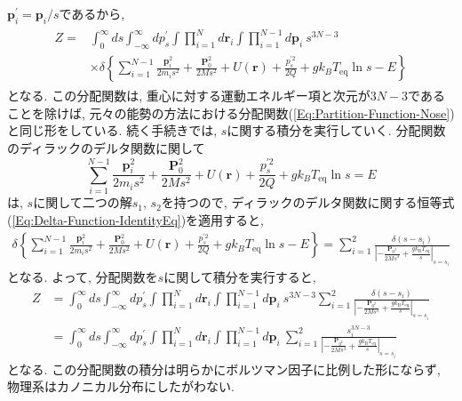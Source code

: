 $\bm{p}_{i}^{\prime} = \bm{p}_{i}/s$であるから, 
\begin{align}
  \begin{split}
  Z =&
  \int_{0}^{\infty} ds
  \int_{- \infty}^{\infty} dp^{\prime}_{s}
  \int \prod_{i=1}^{N} d \bm{r}_{i}
  \int \prod_{i=1}^{N-1} d \bm{p}_{i}~
  s^{3N-3} \\ &\times
  \delta
  \left\{
    \sum_{i=1}^{N-1} \frac{\bm{p}_{i}^{2}}{2m_{i}s^{2}} +
    \frac{\bm{P}_{0}^2}{2Ms^{2}} +
    U(\bm{r}) +
    \frac{p^{\prime 2}_{s}}{2Q} + g k_B T_{\mathrm{eq}} \ln s - E
  \right\}
  \end{split}
\end{align}
となる. この分配関数は, 重心に対する運動エネルギー項と次元が$3N-3$であることを除けば, 元々の能勢の方法における分配関数(\ref{Eq:Partition-Function-Nose})と同じ形をしている. 
続く手続きでは, $s$に関する積分を実行していく. 
分配関数のディラックのデルタ関数に関して
\begin{equation}
  \sum_{i=1}^{N-1} \frac{\bm{p}_{i}^{2}}{2m_{i}s^{2}} +
  \frac{\bm{P}_{0}^2}{2Ms^{2}} +
  U(\bm{r}) +
  \frac{p^{\prime 2}_{s}}{2Q} + g k_B T_{\mathrm{eq}} \ln s = E
\end{equation}
は, $s$に関して二つの解$s_{1}$, $s_{2}$を持つので, ディラックのデルタ関数に関する恒等式(\ref{Eq:Delta-Function-IdentityEq})を適用すると, 
\begin{align}
  \delta
  \left\{
    \sum_{i=1}^{N-1} \frac{\bm{p}_{i}^{2}}{2m_{i}s^{2}} +
    \frac{\bm{P}_{0}^2}{2Ms^{2}} +
    U(\bm{r}) +
    \frac{p^{\prime 2}_{s}}{2Q} + g k_B T_{\mathrm{eq}} \ln s - E
  \right\}
  =
  \sum_{i=1}^{2}
  \frac
  {\delta(s - s_{i})}
  {\left| -\frac{\bm{P}_{0^{2}}}{2Ms^{3}} + \frac{g k_{\mathrm{B}} T_{\mathrm{eq}}}{s} \right|_{s=s_{i}}}
\end{align}
となる. 
よって, 分配関数を$s$に関して積分を実行すると, 
\begin{align}
  Z &=
  \int_{0}^{\infty} ds
  \int_{- \infty}^{\infty} dp^{\prime}_{s}
  \int \prod_{i=1}^{N} d \bm{r}_{i}
  \int \prod_{i=1}^{N-1} d \bm{p}_{i}~
  s^{3N-3}
  \sum_{i=1}^{2}
  \frac
  {\delta(s - s_{i})}
  {\left| -\frac{\bm{P}_{0^{2}}}{2Ms^{3}} + \frac{g k_{\mathrm{B}} T_{\mathrm{eq}}}{s} \right|_{s=s_{i}}}
  \\
  &=
  \int_{0}^{\infty} ds
  \int_{- \infty}^{\infty} dp^{\prime}_{s}
  \int \prod_{i=1}^{N} d \bm{r}_{i}
  \int \prod_{i=1}^{N-1} d \bm{p}_{i}~
  \sum_{i=1}^{2}
  \frac
  {s_{i}^{3N-3}}
  {\left| -\frac{\bm{P}_{0^{2}}}{2Ms^{3}} + \frac{g k_{\mathrm{B}} T_{\mathrm{eq}}}{s} \right|_{s=s_{i}}}
\end{align}
となる. この分配関数の積分は明らかにボルツマン因子に比例した形にならず, 物理系はカノニカル分布にしたがわない. 

